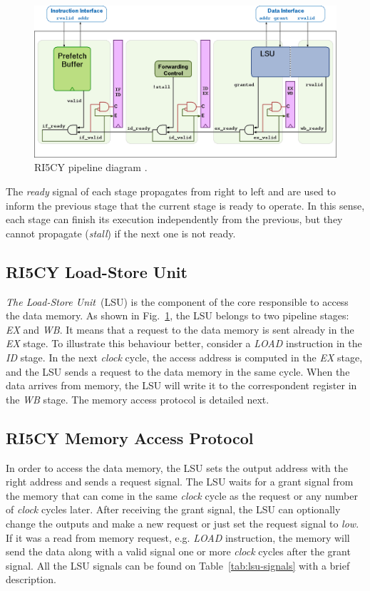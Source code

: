 \begin{figure}[htb!]
	\centering
	\includegraphics[width=\textwidth]{images/ri5cy_pipeline.png}
	\caption{RI5CY pipeline diagram \cite{manual-ri5cy}.}
	\label{fig:ri5cy_pipeline}
\end{figure}

The \textit{ready} signal of each stage propagates from right to left and are used to inform the previous stage that the current stage is ready to operate. In this sense, each stage can finish its execution independently from the previous, but they cannot propagate (\textit{stall}) if the next one is not ready. 

\subsection*{RI5CY Load-Store Unit}

\textit{The Load-Store Unit}~(LSU) is the component of the core responsible to access the data memory. As shown in Fig.~\ref{fig:ri5cy_pipeline}, the LSU belongs to two pipeline stages: \textit{EX} and \textit{WB}. It means that a request to the data memory is sent already in the \textit{EX} stage. To illustrate this behaviour better, consider a \textit{LOAD} instruction in the \textit{ID} stage. In the next \textit{clock} cycle, the access address is computed in the \textit{EX} stage, and the LSU sends a request to the data memory in the same cycle. When the data arrives from memory, the LSU will write it to the correspondent register in the \textit{WB} stage. The memory access protocol is detailed next.

\subsection*{RI5CY Memory Access Protocol}

In order to access the data memory, the LSU sets the output address with the right address and sends a request signal. The LSU waits for a grant signal from the memory that can come in the same \textit{clock} cycle as the request or any number of \textit{clock} cycles later. After receiving the grant signal, the LSU can optionally change the outputs and make a new request or just set the request signal to \textit{low}. If it was a read from memory request, e.g. \textit{LOAD} instruction, the memory will send the data along with a valid signal one or more \textit{clock} cycles after the grant signal. All the LSU signals can be found on Table~\ref{tab:lsu-signals} with a brief description. 

